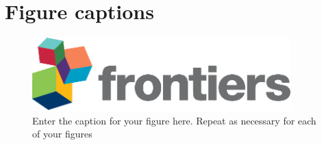 \documentclass[utf8]{FrontiersinHarvard} %
\begin{document}

\section*{Figure captions}


\begin{figure}[h!]
\begin{center}
\includegraphics[width=10cm]{logo1}%
\end{center}
\caption{ Enter the caption for your figure here.  Repeat as  necessary for each of your figures}\label{fig:1}
\end{figure}
\end{document}
